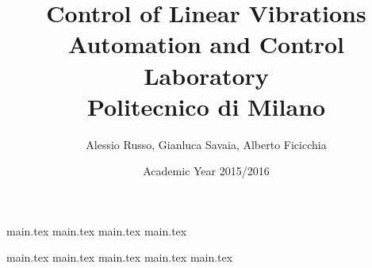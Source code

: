 \documentclass[10pt,a4paper]{report}
\author{Alessio Russo, Gianluca Savaia, Alberto Ficicchia}
\title{Control of Linear Vibrations \\
\Large Automation and Control Laboratory \\
 Politecnico di Milano}
\date{Academic Year 2015/2016}
\begin{document}
\maketitle
\tableofcontents

\clearpage
{main.tex}
\newpage
{main.tex}
\newpage
{main.tex}
\newpage
{main.tex}
\newpage

{main.tex}
\newpage
{main.tex}
\newpage
{main.tex}
\newpage
{main.tex}
\newpage
{main.tex}
\end{document}
